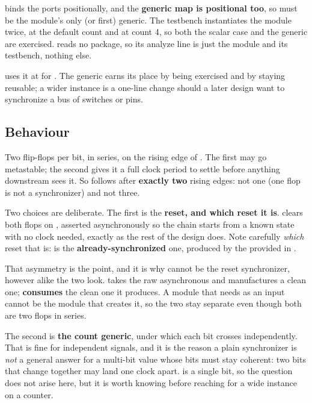  binds the ports positionally, and the \textbf{generic map is positional too}, so
 must be the module's only (or first) generic. The testbench instantiates the module
twice, at the default count and at count 4, so both the scalar case and the generic are exercised.
 reads no package, so its analyze line is just the module and its testbench, nothing
else.

 uses it at  for . The generic earns its place by being
exercised and by staying reusable; a wider instance is a one-line change should a later design want
to synchronize a bus of switches or pins.

\subsection{Behaviour}
\label{c3:sec:sync_behaviour}
Two flip-flops per bit, in series, on the rising edge of . The first may go metastable;
the second gives it a full clock period to settle before anything downstream sees it. So
 follows  after \textbf{exactly two} rising edges: not one (one flop
is not a synchronizer) and not three.

Two choices are deliberate. The first is the \textbf{reset, and which reset it is}. 
clears both flops on , asserted asynchronously so the chain starts from a known
state with no clock needed, exactly as the rest of the design does. Note carefully \emph{which}
reset that is:  is the \textbf{already-synchronized} one, produced by the provided
 in .

That asymmetry is the point, and it is why  cannot be the reset synchronizer, however
alike the two look.  takes the raw asynchronous  and manufactures a
clean one;  \textbf{consumes} the clean one it produces. A module that needs
 as an input cannot be the module that creates it, so the two stay separate even
though both are two flops in series.

The second is \textbf{the count generic}, under which each bit crosses independently. That is fine
for independent signals, and it is the reason a plain synchronizer is \emph{not} a general answer
for a multi-bit value whose bits must stay coherent: two bits that change together may land one
clock apart.  is a single bit, so the question does not arise here, but it is worth knowing
before reaching for a wide instance on a counter.

